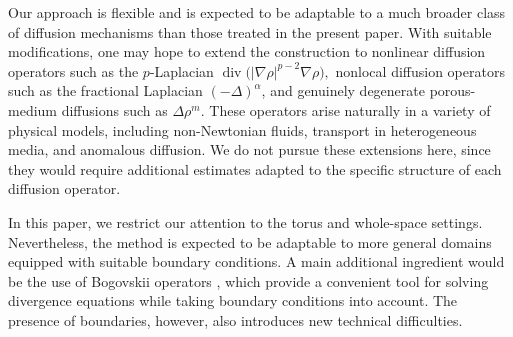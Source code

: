 \documentclass[UTF-8,reqno]{amsart}
\numberwithin{equation}{section}
\theoremstyle{definition}
\begin{document}
Our approach is flexible and is expected to be adaptable to a much broader
class of diffusion mechanisms than those treated in the present paper. With
suitable modifications, one may hope to extend the construction to nonlinear
diffusion operators such as the $p$-Laplacian
$
\operatorname{div}\bigl(|\nabla\rho|^{p-2}\nabla\rho\bigr),
$
nonlocal diffusion operators such as the fractional Laplacian
$(-\Delta)^\alpha$, and genuinely degenerate porous-medium diffusions such as
$
\Delta \rho^m .
$
These operators arise naturally in a variety of physical models, including
non-Newtonian fluids, transport in heterogeneous media, and anomalous
diffusion. We do not pursue these extensions here, since they would require
additional estimates adapted to the specific structure of each diffusion
operator.

In this paper, we restrict our attention to the torus and whole-space settings.
Nevertheless, the method is expected to be adaptable to more general domains
equipped with suitable boundary conditions. A main additional ingredient would
be the use of Bogovskii operators \cite{Bog79}, which provide a convenient
tool for solving divergence equations while taking boundary conditions into
account. The presence of boundaries, however, also introduces new technical
difficulties.
 
\end{document}
